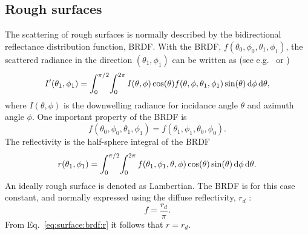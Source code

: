 \subsection{Rough surfaces}
The scattering of rough surfaces is normally described by the bidirectional
reflectance distribution function, BRDF. With the BRDF,
$f(\theta_0,\phi_0,\theta_1,\phi_1)$, the scattered radiance in the
direction $(\theta_1,\phi_1)$ can be written as (see e.g.\ 
\citet{rees:01} or \citet{petty:06})
\begin{equation}
  \label{eq:surface:brdf1}
  I'(\theta_1,\phi_1) = \int_0^{\pi/2} \! \int_0^{2\pi} I(\theta,\phi) 
  \cos(\theta) f(\theta,\phi,\theta_1,\phi_1)
  \sin(\theta) \, \mathrm{d}\phi \, \mathrm{d}\theta,
\end{equation}
where $I(\theta,\phi)$ is the downwelling radiance for incidance angle $\theta$
and azimuth angle $\phi$. One important property of the BRDF is
\begin{equation}
  f(\theta_0,\phi_0,\theta_1,\phi_1) = f(\theta_1,\phi_1,\theta_0,\phi_0).
\end{equation}
The reflectivity is the half-sphere integral of the BRDF
\begin{equation}
  \label{eq:surface:brdf:r}
  r(\theta_1,\phi_1) = \int_0^{\pi/2} \! \int_0^{2\pi} 
  f(\theta_1,\phi_1,\theta,\phi) \cos(\theta)
  \sin(\theta) \, \mathrm{d}\phi \, \mathrm{d}\theta.
\end{equation}
An ideally rough surface is denoted as Lambertian. The BRDF is for this case
constant, and normally expressed using the diffuse reflectivity, $r_d$ 
 \citep[e.g.][]{petty:06}:
\begin{equation}
  \label{eq:surface:lambertian1}
  f = \frac{r_d}{\pi}.
\end{equation}
From Eq.~\ref{eq:surface:brdf:r} it follows that $r = r_d$.





  
